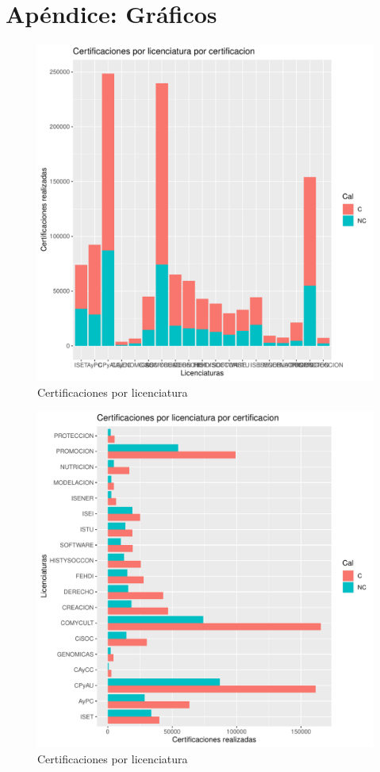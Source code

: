 \documentclass[12pt]{article}
\begin{document}
\section{Ap\'endice: Gr\'aficos}

\begin{figure}
\centering
\includegraphics[scale=0.45]{Graficas/ggplotBarplotLicCal.pdf}
\caption{Certificaciones por licenciatura}
\label{Fig.Cert.Lic-Cal}
\end{figure}


\begin{figure}
\centering
\includegraphics[scale=0.45]{Graficas/ggplotBarplotLicCal2.pdf}
\caption{Certificaciones por licenciatura}
\label{Fig.Cert.Lic-Cal2}
\end{figure}
   
\end{document}
